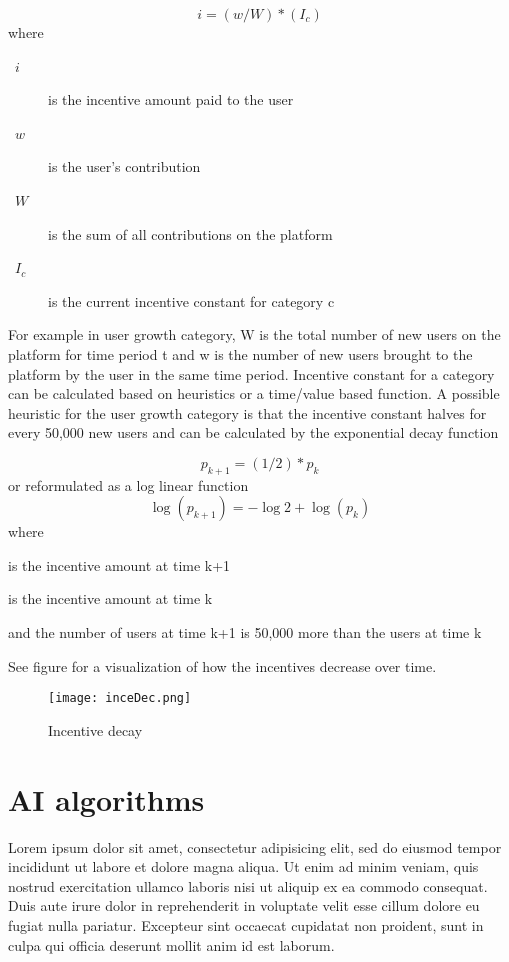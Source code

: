 \documentclass[a4paper]{article}
\begin{document}
\begin{equation}
i=(w/W)*(I_c)\label{eq:weighted_incentive}
\end{equation}
where
\begin{description}
\item[~$i$] is the incentive amount paid to the user
\item[~$w$] is the user's contribution
\item[~$W$] is the sum of all contributions on the platform
\item[~$I_c$] is the current incentive constant for category c
\end{description}
For example in user growth category, W is the total number of new users on the platform for time period t and w is the number of new users brought to the platform by the user in the same time period.
Incentive constant for a category can be calculated based on heuristics or a time/value based function. A possible heuristic for the user growth category is that the incentive constant halves for every 50,000 new users and can be calculated by the exponential decay function 

\begin{equation}
p_{k+1}=(1/2)*p_k\label{eq:exp_decay}
\end{equation}
or reformulated as a log linear function 
\begin{equation}
\log (p_{k+1})=-\log 2 + \log (p_k)\label{eq:log_exp_decay}
\end{equation}
where
\begin{description}
\item[~$p_{k+1}$] is the incentive amount at time k+1
\item[~$p_k$] is the incentive amount at time k
\item and the number of users at time k+1 is 50,000 more than the users at time k
\end{description}
See figure  for a visualization of how the incentives decrease over time.
\begin{figure}[t] \centering
\texttt{[image: inceDec.png]}
\caption{Incentive decay} \label{fig:inc_dec}
\end{figure}


\section{AI algorithms}
Lorem ipsum dolor sit amet, consectetur adipisicing elit, sed do eiusmod tempor
incididunt ut labore et dolore magna aliqua. Ut enim ad minim veniam, quis
nostrud exercitation ullamco laboris nisi ut aliquip ex ea commodo consequat.
Duis aute irure dolor in reprehenderit in voluptate velit esse cillum dolore eu
fugiat nulla pariatur. Excepteur sint occaecat cupidatat non proident, sunt in
culpa qui officia deserunt mollit anim id est laborum.
\end{document}
